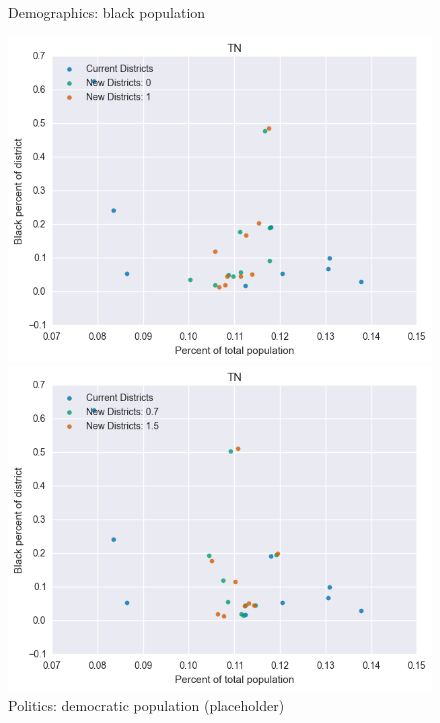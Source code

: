 \begin{figure}[htb!] \centering
\caption{ Demographics: black population }
\includegraphics[width=4.5in]{../analysis/TN/analysis_scatter.png}
\caption{ Politics: democratic population (placeholder)}
\includegraphics[width=4.5in]{../analysis/TN/analysis_scatter2.png}
\end{figure}

\clearpage
\newpage

